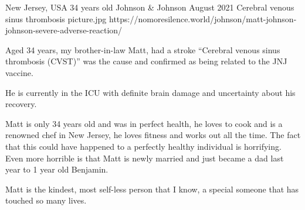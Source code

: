           {New Jersey, USA}
          {34 years old}
          {Johnson \& Johnson}
          {August 2021}
          {Cerebral venous sinus thrombosis}
          {picture.jpg}
          {https://nomoresilence.world/johnson/matt-johnson-johnson-severe-adverse-reaction/}
          {

Aged 34 years, my brother-in-law Matt, had a stroke “Cerebral venous sinus
thrombosis (CVST)” was the cause and confirmed as being related to the JNJ
vaccine.

He is currently in the ICU with definite brain damage and uncertainty about his
recovery.

Matt is only 34 years old and was in perfect health, he loves to cook and is a
renowned chef in New Jersey, he loves fitness and works out all the time. The
fact that this could have happened to a perfectly healthy individual is
horrifying. Even more horrible is that Matt is newly married and just became a
dad last year to 1 year old Benjamin.

Matt is the kindest, most self-less person that I know, a special someone that
has touched so many lives.

}
